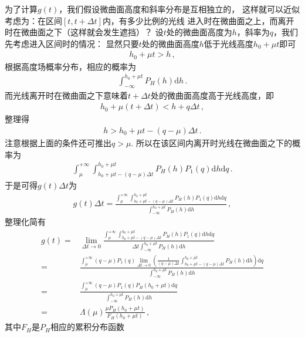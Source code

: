 为了计算$g(t)$，我们假设微曲面高度和斜率分布是互相独立的，
这样就可以近似考虑为：在区间$[t,t+\Delta t]$内，有多少比例的光线
进入时在微曲面之上，而离开时在微曲面之下（这样就会发生遮挡）？
设$t$处的微曲面高度为$h$，斜率为$q$，我们先考虑进入区间时的情况：
显然只要$t$处的微曲面高度$h$低于光线高度$h_0+\mu t$即可
\begin{align}
    h_0+\mu t>h\, ,
\end{align}
根据高度场概率分布，相应的概率为
\begin{align}
    \int_{-\infty}^{h_0+\mu t}P_H(h)\mathrm{d}h\, .
\end{align}
而光线离开时在微曲面之下意味着$t+\Delta t$处的微曲面高度高于光线高度，即
\begin{align}
    h_0+\mu(t+\Delta t)<h+q\Delta t\, ,
\end{align}
整理得
\begin{align}
    h>h_0+\mu t-(q-\mu)\Delta t\, .
\end{align}
注意根据上面的条件还可推出$q>\mu$.
所以在该区间内离开时光线在微曲面之下的概率为
\begin{align}
    \int_{\mu}^{+\infty}\int_{h_0+\mu t-(q-\mu)\Delta t}^{h_0+\mu t}P_H(h)P_1(q)\mathrm{d}h\mathrm{d}q\, .
\end{align}
于是可得$g(t)\Delta t$为
\begin{align}
    g(t)\Delta t=\frac{\displaystyle\int_{\mu}^{+\infty}\int_{h_0+\mu t-(q-\mu)\Delta t}^{h_0+\mu t}P_H(h)P_1(q)\mathrm{d}h\mathrm{d}q}{\displaystyle\int_{-\infty}^{h_0+\mu t}P_H(h)\mathrm{d}h}\, ,
\end{align}
整理化简有
\begin{align}
    g(t)=&\lim\limits_{\Delta t\to 0}\frac{\displaystyle\int_{\mu}^{+\infty}\int_{h_0+\mu t-(q-\mu)\Delta t}^{h_0+\mu t}P_H(h)P_1(q)\mathrm{d}h\mathrm{d}q}{\Delta t\displaystyle\int_{-\infty}^{h_0+\mu t}P_H(h)\mathrm{d}h}\nonumber\\
    =&\frac{\displaystyle\int_{\mu}^{+\infty}(q-\mu)P_1(q)\lim\limits_{\Delta t\to 0}\left(\frac{1}{(q-\mu)\Delta t}\int_{h_0+\mu t-(q-\mu)\Delta t}^{h_0+\mu t}P_H(h)\mathrm{d}h\right)\mathrm{d}q}{\displaystyle\int_{-\infty}^{h_0+\mu t}P_H(h)\mathrm{d}h}\nonumber\\
    =&\frac{\displaystyle\int_{\mu}^{+\infty}(q-\mu)P_1(q)P_H(h_0+\mu t)\mathrm{d}q}{\displaystyle\int_{-\infty}^{h_0+\mu t}P_H(h)\mathrm{d}h}\nonumber\\
    =&\Lambda(\mu)\frac{\mu P_H(h_0+\mu t)}{F_H(h_0+\mu t)}\, ,
\end{align}
其中$F_H$是$P_H$相应的累积分布函数
